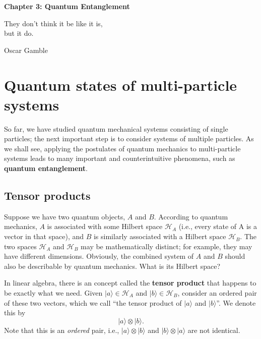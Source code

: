 \documentclass[prx,12pt]{revtex4-2}
\begin{document}
\setcounter{page}{36}

\begin{center}
{\Large \textbf{Chapter 3: Quantum Entanglement}}
\end{center}

\epigraph{They don't think it be like it is, \\but it do.}{Oscar Gamble}

\section{Quantum states of multi-particle systems}

So far, we have studied quantum mechanical systems consisting of
single particles; the next important step is to consider systems of
multiple particles.  As we shall see, applying the postulates of
quantum mechanics to multi-particle systems leads to many important
and counterintuitive phenomena, such as \textbf{quantum entanglement}.

\subsection{Tensor products}
\label{sec:tensorprod}

Suppose we have two quantum objects, $A$ and $B$.  According to
quantum mechanics, $A$ is associated with some Hilbert space
$\mathscr{H}_A$ (i.e., every state of A is a vector in that space),
and $B$ is similarly associated with a Hilbert space $\mathscr{H}_B$.
The two spaces $\mathscr{H}_A$ and $\mathscr{H}_B$ may be
mathematically distinct; for example, they may have different
dimensions.  Obviously, the combined system of $A$ and $B$ should also
be describable by quantum mechanics.  What is its Hilbert space?

In linear algebra, there is an concept called the \textbf{tensor
  product} that happens to be exactly what we need.  Given $|a\rangle
\in \mathscr{H}_A$ and $|b\rangle \in \mathscr{H}_B$, consider an
ordered pair of these two vectors, which we call ``the tensor product
of $|a\rangle$ and $|b\rangle$''.  We denote this by
\begin{equation*}
  |a\rangle \otimes |b\rangle.
\end{equation*}
Note that this is an \textit{ordered} pair, i.e.,
$|a\rangle\otimes|b\rangle$ and $|b\rangle\otimes|a\rangle$ are not
identical.
\end{document}
